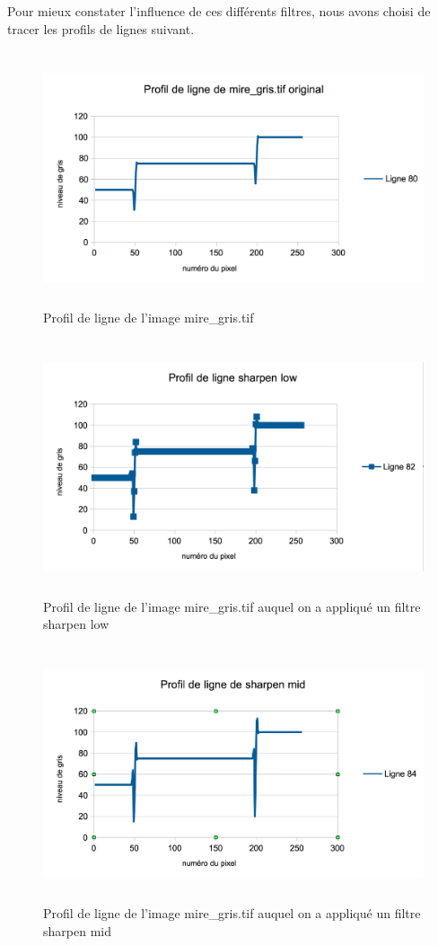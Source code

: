 \documentclass{scrreprt}
\begin{document}
\newpage
Pour mieux constater l'influence de ces différents filtres, nous avons choisi de tracer les profils de lignes suivant.

\begin{figure}[!h]
\centering
\includegraphics[height=7.5cm,width=15cm]{images/profillignemiregris.png}
\caption{Profil de ligne de l'image mire_gris.tif}
\end{figure}

\begin{figure}[!h]
\centering
\includegraphics[height=7.5cm,width=15cm]{images/profillignesharpenlow.png}
\caption{Profil de ligne de l'image mire_gris.tif auquel on a appliqué un filtre sharpen low}
\end{figure}

\newpage
\begin{figure}[!h]
\centering
\includegraphics[height=7.5cm,width=15cm]{images/profillignesharpenmid.png}
\caption{Profil de ligne de l'image mire_gris.tif auquel on a appliqué un filtre sharpen mid}
\end{figure}
\end{document}
